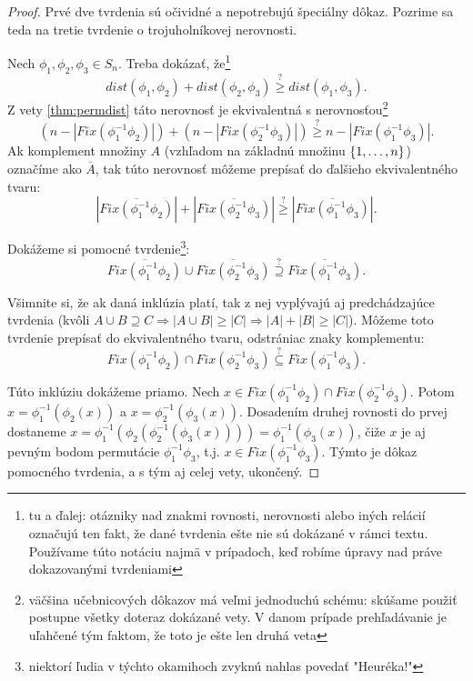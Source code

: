 \begin{proof}
Prvé dve tvrdenia sú očividné a nepotrebujú špeciálny dôkaz.
Pozrime sa teda na tretie tvrdenie o trojuholníkovej nerovnosti.

Nech $\phi_1, \phi_2, \phi_3 \in S_n$. 
Treba dokázať, že\footnote{tu a ďalej: otázniky nad znakmi rovnosti, nerovnosti alebo iných relácií označujú ten fakt, že dané tvrdenia ešte nie sú dokázané v rámci textu. 
Používame túto notáciu najmä v prípadoch, keď robíme úpravy nad práve dokazovanými tvrdeniami} 
$$dist(\phi_1, \phi_2) + dist(\phi_2, \phi_3) \overset{?}{\geq} dist(\phi_1, \phi_3).$$
Z vety \ref{thm:permdist} táto nerovnosť je ekvivalentná s nerovnosťou\footnote{väčšina učebnicových dôkazov má veľmi jednoduchú schému: skúšame použiť postupne všetky doteraz dokázané vety. 
V danom prípade prehľadávanie je uľahčené tým faktom, že toto je ešte len druhá veta}
$$(n - |Fix(\phi_1^{-1}\phi_2)|) + (n - |Fix(\phi_2^{-1}\phi_3)|) \overset{?}{\geq} n - |Fix(\phi_1^{-1}\phi_3)|.$$
Ak komplement množiny $A$ (vzhľadom na základnú množinu $\left\{1, \ldots, n\right\}$) označíme ako $\overline{A}$, tak túto nerovnosť môžeme prepísať do ďalšieho ekvivalentného tvaru:
$$|\overline{Fix(\phi_1^{-1}\phi_2)}| + |\overline{Fix(\phi_2^{-1}\phi_3)}| \overset{?}{\geq} |\overline{Fix(\phi_1^{-1}\phi_3)}|.$$

Dokážeme si pomocné tvrdenie\footnote{niektorí ľudia v týchto okamihoch zvyknú nahlas povedať "Heuréka!"}: 
$$\overline{Fix(\phi_1^{-1}\phi_2)} \cup \overline{Fix(\phi_2^{-1}\phi_3)} \overset{?}{\supseteq} \overline{Fix(\phi_1^{-1}\phi_3)}.$$

Všimnite si, že ak daná inklúzia platí, tak z nej vyplývajú aj predchádzajúce tvrdenia (kvôli $A \cup B \supseteq C \Longrightarrow |A \cup B| \geq |C| \Longrightarrow |A| + |B| \geq |C|$).
Môžeme toto tvrdenie prepísať do ekvivalentného tvaru, odstrániac znaky komplementu:
$$Fix(\phi_1^{-1}\phi_2) \cap Fix(\phi_2^{-1}\phi_3) \overset{?}{\subseteq} Fix(\phi_1^{-1}\phi_3).$$

Túto inklúziu dokážeme priamo. 
Nech $x \in Fix(\phi_1^{-1}\phi_2) \cap Fix(\phi_2^{-1}\phi_3)$. 
Potom $x = \phi_1^{-1}(\phi_2(x))$ a $x = \phi_2^{-1}(\phi_3(x))$.
Dosadením druhej rovnosti do prvej dostaneme $x = \phi_1^{-1}(\phi_2(\phi_2^{-1}(\phi_3(x)))) = \phi_1^{-1}(\phi_3(x))$, čiže $x$ je aj pevným bodom permutácie $\phi_1^{-1} \phi_3$, t.j. $x \in Fix(\phi_1^{-1}\phi_3)$.
Týmto je dôkaz pomocného tvrdenia, a s tým aj celej vety, ukončený.
\end{proof}

